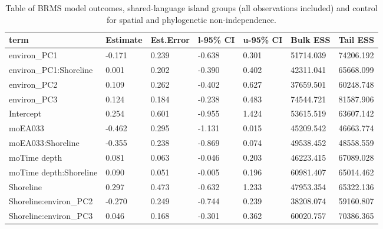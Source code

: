 \begin{table}[ht]
\centering
\begin{tabular}{p{4cm}p{1.65cm}p{1.65cm}p{1.65cm}p{1.65cm}p{1.65cm}p{1.65cm}}
  \toprule
term & Estimate & Est.Error & l-95\% CI & u-95\% CI & Bulk ESS & Tail ESS \\ 
  \midrule
environ\_PC1 & -0.171 & 0.239 & -0.638 & 0.301 & 51714.039 & 74206.192 \\ 
  environ\_PC1:Shoreline & 0.001 & 0.202 & -0.390 & 0.402 & 42311.041 & 65668.099 \\ 
  environ\_PC2 & 0.109 & 0.262 & -0.402 & 0.627 & 37659.501 & 60248.748 \\ 
  environ\_PC3 & 0.124 & 0.184 & -0.238 & 0.483 & 74544.721 & 81587.906 \\ 
  Intercept & 0.254 & 0.601 & -0.955 & 1.424 & 53615.519 & 63607.142 \\ 
  moEA033 & -0.462 & 0.295 & -1.131 & 0.015 & 45209.542 & 46663.774 \\ 
  moEA033:Shoreline & -0.355 & 0.238 & -0.869 & 0.074 & 49538.452 & 48558.559 \\ 
  moTime depth & 0.081 & 0.063 & -0.046 & 0.203 & 46223.415 & 67089.028 \\ 
  moTime depth:Shoreline & 0.090 & 0.051 & -0.005 & 0.196 & 60981.407 & 65014.462 \\ 
  Shoreline & 0.297 & 0.473 & -0.632 & 1.233 & 47953.354 & 65322.136 \\ 
  Shoreline:environ\_PC2 & -0.270 & 0.249 & -0.744 & 0.239 & 38208.074 & 59160.807 \\ 
  Shoreline:environ\_PC3 & 0.046 & 0.168 & -0.301 & 0.362 & 60020.757 & 70386.365 \\ 
   \bottomrule
\end{tabular}
\caption{Table of BRMS model outcomes, shared-language island groups (all observations included) and control for spatial and phylogenetic non-independence.} 
\label{BRMS_effects_medium_control_sp}
\end{table}
